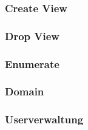 \begin{multicols}{2}
        \subsubsection{Create View}
            
        \subsubsection{Drop View}
            
        \subsubsection{Enumerate}
            
        \subsubsection{Domain}
            
        \subsubsection{Userverwaltung}
                            
    \end{multicols}